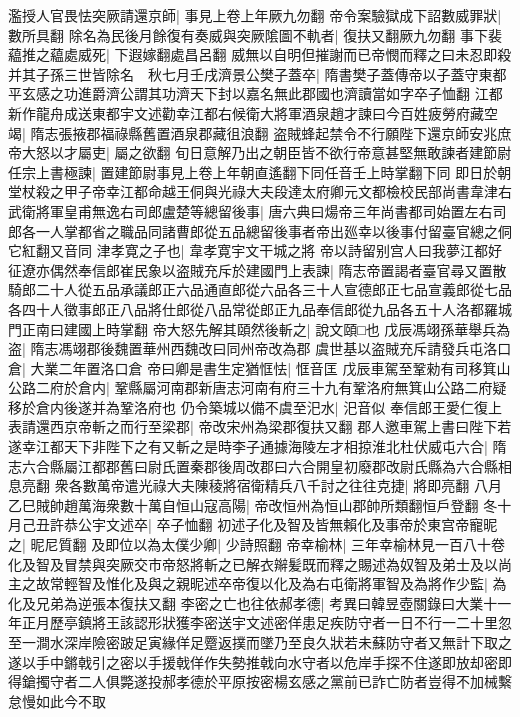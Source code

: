 濫授人官畏怯突厥請還京師|{
	事見上卷上年厥九勿翻}
帝令案驗獄成下詔數威罪狀|{
	數所具翻}
除名為民後月餘復有奏威與突厥隂圖不軌者|{
	復扶又翻厥九勿翻}
事下裴藴推之藴處威死|{
	下遐嫁翻處昌呂翻}
威無以自明但摧謝而已帝憫而釋之曰未忍即殺并其子孫三世皆除名　秋七月壬戌濟景公樊子蓋卒|{
	隋書樊子蓋傳帝以子蓋守東都平玄感之功進爵濟公謂其功濟天下封以嘉名無此郡國也濟讀當如字卒子恤翻}
江都新作龍舟成送東都宇文述勸幸江都右候衛大將軍酒泉趙才諫曰今百姓疲勞府藏空竭|{
	隋志張掖郡福祿縣舊置酒泉郡藏徂浪翻}
盗賊蜂起禁令不行願陛下還京師安兆庶帝大怒以才屬吏|{
	屬之欲翻}
旬日意解乃出之朝臣皆不欲行帝意甚堅無敢諫者建節尉任宗上書極諫|{
	置建節尉事見上卷上年朝直遙翻下同任音壬上時掌翻下同}
即日於朝堂杖殺之甲子帝幸江都命越王侗與光祿大夫段達太府卿元文都檢校民部尚書韋津右武衛將軍皇甫無逸右司郎盧楚等總留後事|{
	唐六典曰煬帝三年尚書都司始置左右司郎各一人掌都省之職品同諸曹郎從五品總留後事者帝出廵幸以後事付留臺官總之侗它紅翻又音同}
津孝寛之子也|{
	韋孝寛宇文干城之將}
帝以詩留别宫人曰我夢江都好征遼亦偶然奉信郎崔民象以盗賊充斥於建國門上表諫|{
	隋志帝置謁者臺官尋又置散騎郎二十人從五品承議郎正六品通直郎從六品各三十人宣德郎正七品宣義郎從七品各四十人徵事郎正八品將仕郎從八品常從郎正九品奉信郎從九品各五十人洛都羅城門正南曰建國上時掌翻}
帝大怒先解其頤然後斬之|{
	說文頤□也}
戊辰馮翊孫華舉兵為盗|{
	隋志馮翊郡後魏置華州西魏改曰同州帝改為郡}
虞世基以盗賊充斥請發兵屯洛口倉|{
	大業二年置洛口倉}
帝曰卿是書生定猶恇怯|{
	恇音匡}
戊辰車駕至鞏勑有司移箕山公路二府於倉内|{
	鞏縣屬河南郡新唐志河南有府三十九有鞏洛府無箕山公路二府疑移於倉内後遂并為鞏洛府也}
仍令築城以備不虞至汜水|{
	汜音似}
奉信郎王愛仁復上表請還西京帝斬之而行至梁郡|{
	帝改宋州為梁郡復扶又翻}
郡人邀車駕上書曰陛下若遂幸江都天下非陛下之有又斬之是時李子通據海陵左才相掠淮北杜伏威屯六合|{
	隋志六合縣屬江都郡舊曰尉氏置秦郡後周改郡曰六合開皇初廢郡改尉氏縣為六合縣相息亮翻}
衆各數萬帝遣光祿大夫陳稜將宿衛精兵八千討之往往克捷|{
	將即亮翻}
八月乙巳賊帥趙萬海衆數十萬自恒山寇高陽|{
	帝改恒州為恒山郡帥所類翻恒戶登翻}
冬十月己丑許恭公宇文述卒|{
	卒子恤翻}
初述子化及智及皆無賴化及事帝於東宫帝寵昵之|{
	昵尼質翻}
及即位以為太僕少卿|{
	少詩照翻}
帝幸榆林|{
	三年幸榆林見一百八十卷}
化及智及冒禁與突厥交市帝怒將斬之已解衣辮髪既而釋之賜述為奴智及弟士及以尚主之故常輕智及惟化及與之親昵述卒帝復以化及為右屯衛將軍智及為將作少監|{
	為化及兄弟為逆張本復扶又翻}
李密之亡也往依郝孝德|{
	考異曰韓昱壺關錄曰大業十一年正月歷亭鎮將王該認形狀獲李密送宇文述密佯患足疾防守者一日不行一二十里忽至一澗水深岸險密跛足寅緣佯足蹷返撲而墜乃至良久狀若未蘇防守者又無計下取之遂以手中鏘戟引之密以手援戟佯作失勢推戟向水守者以危岸手探不住遂即放却密即得鎗擉守者二人俱斃遂投郝孝德於平原按密楊玄感之黨前已詐亡防者豈得不加械繫怠慢如此今不取}
